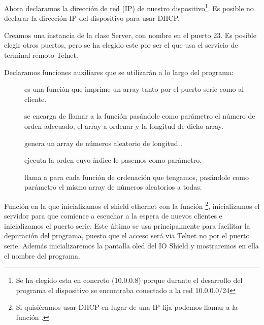
Ahora declaramos la dirección de red (IP) de nuestro dispositivo\protect\footnote{Se ha elegido esta en concreto (10.0.0.8) porque durante el desarrollo del programa el dispositivo se encontraba conectado a la red 10.0.0.0/24}. Es posible no declarar la dirección IP del dispositivo para usar DHCP.


Creamos una instancia de la clase Server, con nombre  en el puerto 23. Es posible elegir otros puertos, pero se ha elegido este por ser el que usa el servicio de terminal remoto Telnet.


Declaramos funciones auxiliares que se utilizarán a lo largo del programa:
\begin{description}
	\item[] es una función que imprime un array tanto por el puerto serie como al cliente.
	\item[] se encarga de llamar a la función  pasándole como parámetro el número de orden adecuado, el array a ordenar y la longitud de dicho array.
	\item[] genera un array de números aleatorio de longitud .
	\item[] ejecuta la orden cuyo índice le pasemos como parámetro.
	\item[] llama a  para cada función de ordenación que tengamos, pasándole como parámetro el mismo array de números aleatorios a todas.
\end{description}


Función  en la que inicializamos el shield ethernet con la función \protect\footnote{Si quisiéramos usar DHCP en lugar de una IP fija podemos llamar a la función .}, inicializamos el servidor para que comience a escuchar a la espera de nuevos clientes e inicializamos el puerto serie. Este último se usa principalmente para facilitar la depuración del programa, puesto que el acceso será via Telnet no por el puerto serie. Además inicializaremos la pantalla oled del IO Shield y mostraremos en ella el nombre del programa.

